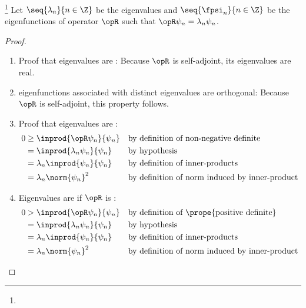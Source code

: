 \begin{theorem}
\footnote{
  }
Let $\seq{\lambda_n}{n\in\Z}$ be the eigenvalues and
    $\seq{\fpsi_n}{n\in\Z}$ be the eigenfunctions of
    operator $\opR$ such that
    $\opR \psi_n = \lambda_n \psi_n$.
\end{theorem}
\begin{proof}
\begin{enumerate}
\item Proof that eigenvalues are :
Because $\opR$ is self-adjoint, its eigenvalues are real.

\item eigenfunctions associated with distinct eigenvalues are orthogonal:
Because $\opR$ is self-adjoint, this property follows.

\item Proof that eigenvalues are :
\begin{align*}
   0 &\ge \inprod{\opR \psi_n}{\psi_n}
     &&   \text{by definition of non-negative definite}
   \\&=   \inprod{\lambda_n \psi_n}{\psi_n}
     &&   \text{by hypothesis}
   \\&=   \lambda_n \inprod{\psi_n}{\psi_n}
     &&   \text{by definition of inner-products}
   \\&=   \lambda_n \norm{\psi_n}^2
     &&   \text{by definition of norm induced by inner-product}
\end{align*}

\item Eigenvalues are  if $\opR$ is :
\begin{align*}
   0 &> \inprod{\opR \psi_n}{\psi_n}
     && \text{by definition of \prope{positive definite}}
   \\&= \inprod{\lambda_n \psi_n}{\psi_n}
     && \text{by hypothesis}
   \\&= \lambda_n \inprod{\psi_n}{\psi_n}
     && \text{by definition of inner-products}
   \\&= \lambda_n \norm{\psi_n}^2
     && \text{by definition of norm induced by inner-product}
\end{align*}

\end{enumerate}
\end{proof}


